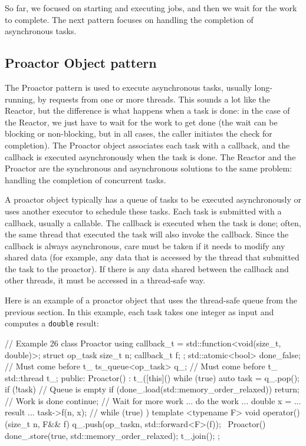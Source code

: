 So far, we focused on starting and executing jobs, and then we wait for the work to complete. The next pattern focuses on handling the completion of asynchronous tasks.

\subsection{Proactor Object pattern}

The Proactor pattern is used to execute asynchronous tasks, usually long-running, by requests from one or more threads. This sounds a lot like the Reactor, but the difference is what happens when a task is done: in the case of the Reactor, we just have to wait for the work to get done (the wait can be blocking or non-blocking, but in all cases, the caller initiates the check for completion). The Proactor object associates each task with a callback, and the callback is executed asynchronously when the task is done. The Reactor and the Proactor are the synchronous and asynchronous solutions to the same problem: handling the completion of concurrent tasks.

A proactor object typically has a queue of tasks to be executed asynchronously or uses another executor to schedule these tasks. Each task is submitted with a callback, usually a callable. The callback is executed when the task is done; often, the same thread that executed the task will also invoke the callback. Since the callback is always asynchronous, care must be taken if it needs to modify any shared data (for example, any data that is accessed by the thread that submitted the task to the proactor). If there is any data shared between the callback and other threads, it must be accessed in a thread-safe way.

Here is an example of a proactor object that uses the thread-safe queue from the previous section. In this example, each task takes one integer as input and computes a \texttt{double} result:

\begin{code}
// Example 26
class Proactor {
  using callback_t = std::function<void(size_t, double)>;
  struct op_task {
    size_t n;
    callback_t f;
  };
  std::atomic<bool> done_{false}; // Must come before t_
  ts_queue<op_task> q_;           // Must come before t_
  std::thread t_;
  public:
  Proactor() : t_([this]() {
    while (true) {
      auto task = q_.pop();
      if (!task) {                // Queue is empty
        if (done_.load(std::memory_order_relaxed)) {
          return;                 // Work is done
        }
        continue;                 // Wait for more work
      }
      ... do the work ...
      double x = ... result ...
      task->f(n, x);
    } // while (true)
  }) {}
  template <typename F>
  void operator()(size_t n, F&& f) {
    q_.push(op_task{n, std::forward<F>(f)});
  }
  ~Proactor() {
    done_.store(true, std::memory_order_relaxed);
    t_.join();
  }
};
\end{code}

